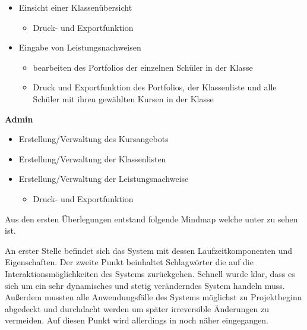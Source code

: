 \documentclass[12pt, twoside, a4paper, ngerman]{article}
\begin{document}
\begin{itemize}
  \item Einsicht einer Klassenübersicht
  \begin{itemize}
    \item Druck- und Exportfunktion 
  \end{itemize}
  \item Eingabe von Leistungsnachweisen
  \begin{itemize}
    \item bearbeiten des Portfolios der einzelnen Schüler in der Klasse
    \item Druck und Exportfunktion des Portfolios, der Klassenliste und alle Schüler mit ihren gewählten Kursen in der Klasse
  \end{itemize}
\end{itemize}
 
\textbf{Admin}

\begin{itemize}
  \item Erstellung/Verwaltung des Kursangebots
  \item Erstellung/Verwaltung der Klassenlisten
  \item Erstellung/Verwaltung der Leistungsnachweise
  \begin{itemize}
    \item Druck- und Exportfunktion
  \end{itemize}
\end{itemize}

Aus den ersten Überlegungen entstand folgende Mindmap welche unter  zu sehen ist.

An erster Stelle befindet sich das System mit dessen Laufzeitkomponenten und Eigenschaften. Der zweite Punkt beinhaltet Schlagwörter die auf die Interaktionsmöglichkeiten des Systems zurückgehen. Schnell wurde klar, dass es sich um ein sehr dynamisches und stetig veränderndes System handeln muss. Außerdem mussten alle Anwendungsfälle des Systems möglichst zu Projektbeginn abgedeckt und durchdacht werden um später irreversible Änderungen zu vermeiden. Auf diesen Punkt wird allerdings in  noch näher eingegangen.
\end{document}
